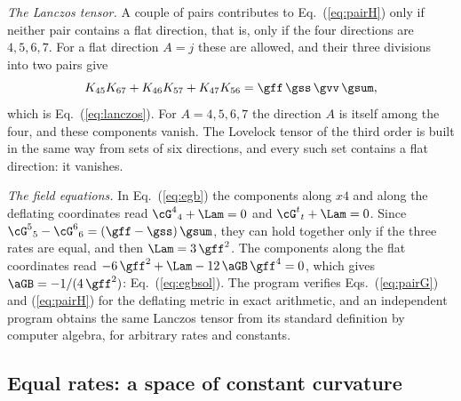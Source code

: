 \emph{The Lanczos tensor.} A couple of pairs contributes to Eq.~(\ref{eq:pairH}) only if neither
pair contains a flat direction, that is, only if the four directions are $4,5,6,7$. For a flat
direction $A=j$ these are allowed, and their three divisions into two pairs give
\begin{equation}
K_{45}K_{67}+K_{46}K_{57}+K_{47}K_{56}=\gff\,\gss\,\gvv\,\gsum ,
\end{equation}
which is Eq.~(\ref{eq:lanczos}). For $A=4,5,6,7$ the direction $A$ is itself among the four, and
these components vanish. The Lovelock tensor of the third order is built in the same way from sets
of six directions, and every such set contains a flat direction: it vanishes.

\emph{The field equations.} In Eq.~(\ref{eq:egb}) the components along $x4$ and along the deflating
coordinates read $\cG^{4}{}_{4}+\Lam=0$ and $\cG^{t}{}_{t}+\Lam=0$. Since
$\cG^{5}{}_{5}-\cG^{6}{}_{6}=(\gff-\gss)\,\gsum$, they can hold together only if the three rates are
equal, and then $\Lam=3\,\gff^{2}$. The components along the flat coordinates read
$-6\,\gff^{2}+\Lam-12\,\aGB\,\gff^{4}=0$, which gives $\aGB=-1/(4\,\gff^{2})$:
Eq.~(\ref{eq:egbsol}). The program verifies Eqs.~(\ref{eq:pairG}) and (\ref{eq:pairH}) for the
deflating metric in exact arithmetic, and an independent program obtains the same Lanczos tensor
from its standard definition by computer algebra, for arbitrary rates and constants.

\subsection{Equal rates: a space of constant curvature}

